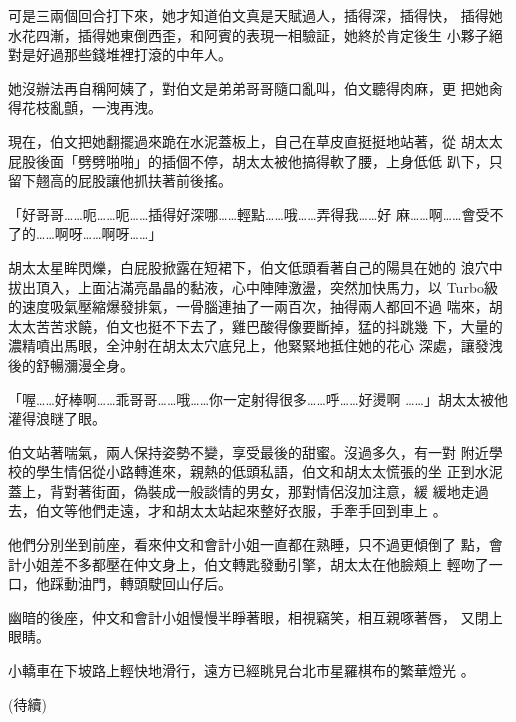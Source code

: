 可是三兩個回合打下來，她才知道伯文真是天賦過人，插得深，插得快，
插得她水花四漸，插得她東倒西歪，和阿賓的表現一相驗証，她終於肯定後生
小夥子絕對是好過那些錢堆裡打滾的中年人。

她沒辦法再自稱阿姨了，對伯文是弟弟哥哥隨口亂叫，伯文聽得肉麻，更
把她肏得花枝亂顫，一洩再洩。

現在，伯文把她翻擺過來跪在水泥蓋板上，自己在草皮直挺挺地站著，從
胡太太屁股後面「劈劈啪啪」的插個不停，胡太太被他搞得軟了腰，上身低低
趴下，只留下翹高的屁股讓他抓扶著前後搖。

「好哥哥……呃……呃……插得好深哪……輕點……哦……弄得我……好
麻……啊……會受不了的……啊呀……啊呀……」

胡太太星眸閃爍，白屁股掀露在短裙下，伯文低頭看著自己的陽具在她的
浪穴中拔出頂入，上面沾滿亮晶晶的黏液，心中陣陣激盪，突然加快馬力，以
Turbo級的速度吸氣壓縮爆發排氣，一骨腦連抽了一兩百次，抽得兩人都回不過
喘來，胡太太苦苦求饒，伯文也挺不下去了，雞巴酸得像要斷掉，猛的抖跳幾
下，大量的濃精噴出馬眼，全沖射在胡太太穴底兒上，他緊緊地抵住她的花心
深處，讓發洩後的舒暢瀰漫全身。

「喔……好棒啊……乖哥哥……哦……你一定射得很多……呼……好燙啊
……」胡太太被他灌得浪瞇了眼。

伯文站著喘氣，兩人保持姿勢不變，享受最後的甜蜜。沒過多久，有一對
附近學校的學生情侶從小路轉進來，親熱的低頭私語，伯文和胡太太慌張的坐
正到水泥蓋上，背對著街面，偽裝成一般談情的男女，那對情侶沒加注意，緩
緩地走過去，伯文等他們走遠，才和胡太太站起來整好衣服，手牽手回到車上
。

他們分別坐到前座，看來仲文和會計小姐一直都在熟睡，只不過更傾倒了
點，會計小姐差不多都壓在仲文身上，伯文轉匙發動引擎，胡太太在他臉頰上
輕吻了一口，他踩動油門，轉頭駛回山仔后。

幽暗的後座，仲文和會計小姐慢慢半睜著眼，相視竊笑，相互親啄著唇，
又閉上眼睛。

小轎車在下坡路上輕快地滑行，遠方已經眺見台北市星羅棋布的繁華燈光
。

(待續)










